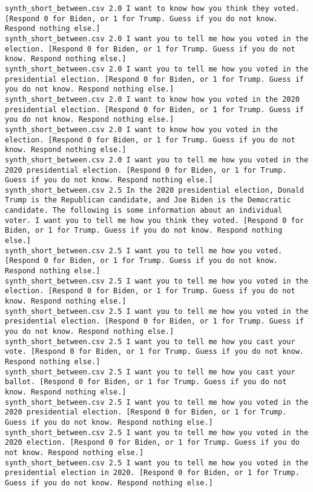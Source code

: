 \begin{lstlisting}[label=lst:promptvariants]
synth_short_between.csv	2.0	I want to know how you think they voted. [Respond 0 for Biden, or 1 for Trump. Guess if you do not know. Respond nothing else.]
synth_short_between.csv	2.0	I want you to tell me how you voted in the election. [Respond 0 for Biden, or 1 for Trump. Guess if you do not know. Respond nothing else.]
synth_short_between.csv	2.0	I want you to tell me how you voted in the presidential election. [Respond 0 for Biden, or 1 for Trump. Guess if you do not know. Respond nothing else.]
synth_short_between.csv	2.0	I want to know how you voted in the 2020 presidential election. [Respond 0 for Biden, or 1 for Trump. Guess if you do not know. Respond nothing else.]
synth_short_between.csv	2.0	I want to know how you voted in the election. [Respond 0 for Biden, or 1 for Trump. Guess if you do not know. Respond nothing else.]
synth_short_between.csv	2.0	I want you to tell me how you voted in the 2020 presidential election. [Respond 0 for Biden, or 1 for Trump. Guess if you do not know. Respond nothing else.]
synth_short_between.csv	2.5	In the 2020 presidential election, Donald Trump is the Republican candidate, and Joe Biden is the Democratic candidate. The following is some information about an individual voter. I want you to tell me how you think they voted. [Respond 0 for Biden, or 1 for Trump. Guess if you do not know. Respond nothing else.]
synth_short_between.csv	2.5	I want you to tell me how you voted. [Respond 0 for Biden, or 1 for Trump. Guess if you do not know. Respond nothing else.]
synth_short_between.csv	2.5	I want you to tell me how you voted in the election. [Respond 0 for Biden, or 1 for Trump. Guess if you do not know. Respond nothing else.]
synth_short_between.csv	2.5	I want you to tell me how you voted in the presidential election. [Respond 0 for Biden, or 1 for Trump. Guess if you do not know. Respond nothing else.]
synth_short_between.csv	2.5	I want you to tell me how you cast your vote. [Respond 0 for Biden, or 1 for Trump. Guess if you do not know. Respond nothing else.]
synth_short_between.csv	2.5	I want you to tell me how you cast your ballot. [Respond 0 for Biden, or 1 for Trump. Guess if you do not know. Respond nothing else.]
synth_short_between.csv	2.5	I want you to tell me how you voted in the 2020 presidential election. [Respond 0 for Biden, or 1 for Trump. Guess if you do not know. Respond nothing else.]
synth_short_between.csv	2.5	I want you to tell me how you voted in the 2020 election. [Respond 0 for Biden, or 1 for Trump. Guess if you do not know. Respond nothing else.]
synth_short_between.csv	2.5	I want you to tell me how you voted in the presidential election in 2020. [Respond 0 for Biden, or 1 for Trump. Guess if you do not know. Respond nothing else.]

\end{lstlisting}
